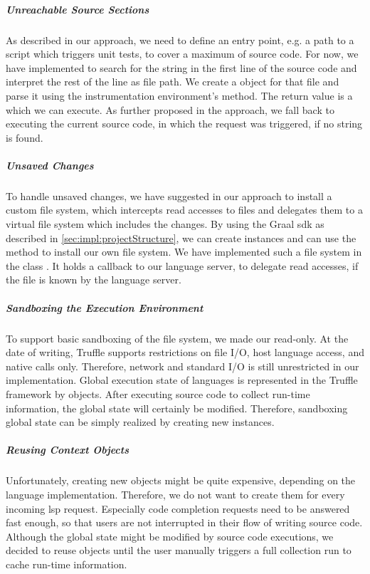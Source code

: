     \subparagraph{Unreachable Source Sections}
    As described in our approach, we need to define an entry point, e.g. a path to a script which triggers unit tests, to cover a maximum of source code. For now, we have implemented to search for the string  in the first line of the source code and interpret the rest of the line as file path. We create a  object for that file and parse it using the instrumentation environment's  method. The return value is a  which we can execute. As further proposed in the approach, we fall back to executing the current source code, in which the request was triggered, if no  string is found.

    \subparagraph{Unsaved Changes}
    To handle unsaved changes, we have suggested in our approach to install a custom file system, which intercepts read accesses to files and delegates them to a virtual file system which includes the changes. By using the Graal \ac{sdk} as described in \autoref{sec:impl:projectStructure}, we can create  instances and can use the method  to install our own file system. We have implemented such a file system in the class . It holds a callback to our language server, to delegate read accesses, if the file is known by the language server.

    \subparagraph{Sandboxing the Execution Environment}
    To support basic sandboxing of the file system, we made our  read-only. At the date of writing, Truffle supports restrictions on file I/O, host language access, and native calls only. Therefore, network and standard I/O is still unrestricted in our implementation. Global execution state of languages is represented in the Truffle framework by  objects. After executing source code to collect run-time information, the global state will certainly be modified. Therefore, sandboxing global state can be simply realized by creating new  instances.

    \subparagraph{Reusing Context Objects}
    Unfortunately, creating new  objects might be quite expensive, depending on the language implementation. Therefore, we do not want to create them for every incoming \ac{lsp} request. Especially code completion requests need to be answered fast enough, so that users are not interrupted in their flow of writing source code. Although the global state might be modified by source code executions, we decided to reuse  objects until the user manually triggers a full collection run to cache run-time information.

